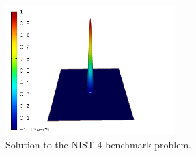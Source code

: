 \documentclass[12pt]{elsarticle}
\begin{document}
\begin{figure}[H]
\centering
\includegraphics[height=5cm]{nist/nist-4/solution.png}
\caption{Solution to the NIST-4 benchmark problem.}
\vspace{-3mm}
\label{fig:sln-nist04}
\end{figure}

\end{document}
